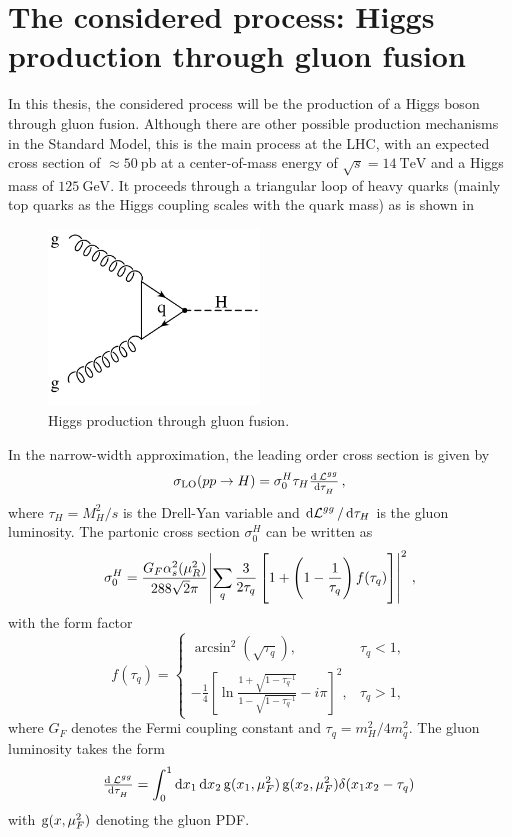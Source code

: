 \section{The considered process: Higgs production through gluon fusion}
In this thesis, the considered process will be the production of a Higgs boson through gluon fusion.
Although there are other possible production mechanisms in the Standard Model, this is the main process at the LHC, with an expected cross section of $\approx \SI{50}{\pico\barn}$ at a center-of-mass energy of $\sqrt{s} = \SI{14}{\tera\electronvolt}$ and a Higgs mass of $\SI{125}{\giga\electronvolt}$. \cite{higgshandbook1}
It proceeds through a triangular loop of heavy quarks (mainly top quarks as the Higgs coupling scales with the quark mass) as is shown in 
%
\begin{figure}[]
	\includegraphics[width=0.5\textwidth]{images/gluonfusion.pdf}
	\caption{Higgs production through gluon fusion.}
	\label{fig:gluonfusion}
\end{figure}
%

In the narrow-width approximation, the leading order cross section is given by \cite{gluonfusioncrosssection}
%
\begin{equation}
	\sigma_\text{LO}(pp \rightarrow H) = \sigma_0^H \tau_H \od{\lumi^{gg}}{\tau_H} \, ,
\end{equation}
%
where $\tau_H = M_H^2/s$ is the Drell-Yan variable and $\dif \lumi^{gg} / \dif \tau_H$ is the gluon luminosity.
The partonic cross section $\sigma_0^H$ can be written as
\begin{equation}
	\sigma_0^H = \frac{G_F \alpha_s^2(\mu_R^2)}{288 \sqrt{2} \pi} \abs{ \sum_q \frac{3}{2 \tau_q} \left[ 1 + \left( 1 - \frac{1}{\tau_q} \right) f(\tau_q) \right] }^2  \, ,
\end{equation}
%
with the form factor
%
\[ f(\tau_q) = 
\begin{cases}
	\arcsin^2 \left( \sqrt{\tau_q} \right) ,																& \tau_q < 1, \\
	- \frac{1}{4} \left[ \ln \frac{1 + \sqrt{1-\tau_q^{-1}}}{1 - \sqrt{1-\tau_q^{-1}}} -i \pi \right]^2 ,	& \tau_q > 1,
\end{cases}
\]
%
where $G_F$ denotes the Fermi coupling constant and $\tau_q = m_H^2/4m_q^2$.
The gluon luminosity takes the form
%
\begin{equation}
	\od{\lumi^{gg}}{\tau_H} = \int_0^1 \dif x_1 \dif x_2 \gluonpdf(x_1,\mu_F^2) \gluonpdf(x_2,\mu_F^2) \delta(x_1 x_2 - \tau_q) \,
\end{equation}
%
with $\operatorname{g}(x,\mu_F^2)$ denoting the gluon PDF.

